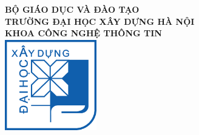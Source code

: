 \begin{titlepage}

\thispagestyle{empty}

\begin{center}

{\textbf{\large{BỘ GIÁO DỤC VÀ ĐÀO TẠO}}}\\[0.5cm]
{\textbf{\large{TRƯỜNG ĐẠI HỌC XÂY DỰNG HÀ NỘI}}}\\[0.5cm]
{\textbf{\large{KHOA CÔNG NGHỆ THÔNG TIN}}}\\[0.5cm]

\includegraphics[width=40mm, height=40mm]{img/docspics/01_logo.png}\\[0.5cm]


\end{center}
\end{titlepage}
